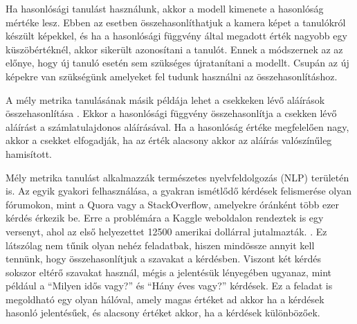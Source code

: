 Ha hasonlósági tanulást használunk, akkor a modell kimenete a hasonlóság mértéke lesz. Ebben az esetben összehasonlíthatjuk a kamera képet a tanulókról készült képekkel, és ha a hasonlósági függvény által megadott érték nagyobb egy küszöbértéknél, akkor sikerült azonosítani a tanulót. Ennek a módszernek az az előnye, hogy új tanuló esetén sem szükséges újratanítani a modellt. Csupán az új képekre van szükségünk amelyeket fel tudunk használni az összehasonlításhoz.


A mély metrika tanulásának másik példája lehet a csekkeken lévő aláírások összehasonlítása \cite{soleimani2016signature}. Ekkor a hasonlósági függvény összehasonlítja a csekken lévő aláírást a számlatulajdonos aláírásával. Ha a hasonlóság értéke megfelelően nagy, akkor a csekket elfogadják, ha az érték alacsony akkor az aláírás valószínűleg hamisított.


Mély metrika tanulást alkalmazzák természetes nyelvfeldolgozás (NLP) területén is. Az egyik gyakori felhasználása, a gyakran ismétlődő kérdések felismerése olyan fórumokon, mint a Quora vagy a StackOverflow, amelyekre óránként több ezer kérdés érkezik be. Erre a problémára a Kaggle weboldalon rendeztek is egy versenyt, ahol az első helyezettet 12500 amerikai dollárral jutalmazták. \cite{kaggle}. Ez látszólag nem tűnik olyan nehéz feladatbak, hiszen mindössze annyit kell tennünk, hogy összehasonlítjuk a szavakat a kérdésben. Viszont két kérdés sokszor eltérő szavakat használ, mégis a jelentésük lényegében ugyanaz, mint például a ``Milyen idős vagy?'' és ``Hány éves vagy?'' kérdések. Ez a feladat is megoldható egy olyan hálóval, amely magas értéket ad akkor ha a kérdések hasonló jelentésűek, és alacsony értéket akkor, ha a kérdések különbözőek.

